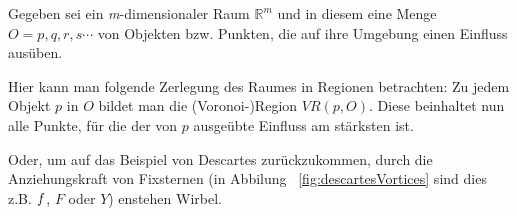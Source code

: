 Gegeben sei ein \textit{m}-dimensionaler Raum $\mathbb{R}^m$ und in diesem eine Menge $O = {p, q, r, s \cdots}$ von Objekten bzw. Punkten, die auf ihre Umgebung einen Einfluss ausüben.

Hier kann man folgende Zerlegung des Raumes in Regionen betrachten: Zu jedem Objekt $p$ in $O$ bildet man die (Voronoi-)Region $VR(p, O)$. Diese beinhaltet nun alle Punkte, für die der von $p$ ausgeübte Einfluss am stärksten ist.

Oder, um auf das Beispiel von Descartes zurückzukommen, durch die Anziehungskraft von Fixsternen (in Abbilung ~\ref{fig:descartesVortices} sind dies z.B. $\mathnormal{f}$, $F$ oder $Y$) enstehen Wirbel. \parencite{klein2005algorithmischegeometrie}
